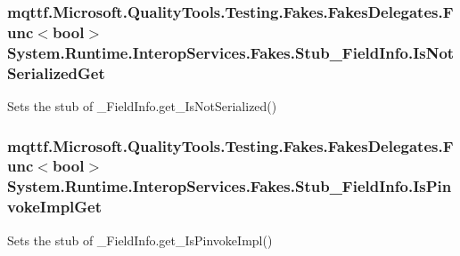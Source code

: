 \hypertarget{class_system_1_1_runtime_1_1_interop_services_1_1_fakes_1_1_stub___field_info_a972d18dfd1a9cc9afaa0d1083fe84ebc}{
\subsubsection[{Is\-Not\-Serialized\-Get}]{\setlength{\rightskip}{0pt plus 5cm}mqttf.\-Microsoft.\-Quality\-Tools.\-Testing.\-Fakes.\-Fakes\-Delegates.\-Func$<$bool$>$ System.\-Runtime.\-Interop\-Services.\-Fakes.\-Stub\-\_\-\-Field\-Info.\-Is\-Not\-Serialized\-Get}}\label{class_system_1_1_runtime_1_1_interop_services_1_1_fakes_1_1_stub___field_info_a972d18dfd1a9cc9afaa0d1083fe84ebc}


Sets the stub of \-\_\-\-Field\-Info.\-get\-\_\-\-Is\-Not\-Serialized()

\hypertarget{class_system_1_1_runtime_1_1_interop_services_1_1_fakes_1_1_stub___field_info_ac5e07cdede9b031181af04fc26a67bd7}{
\subsubsection[{Is\-Pinvoke\-Impl\-Get}]{\setlength{\rightskip}{0pt plus 5cm}mqttf.\-Microsoft.\-Quality\-Tools.\-Testing.\-Fakes.\-Fakes\-Delegates.\-Func$<$bool$>$ System.\-Runtime.\-Interop\-Services.\-Fakes.\-Stub\-\_\-\-Field\-Info.\-Is\-Pinvoke\-Impl\-Get}}\label{class_system_1_1_runtime_1_1_interop_services_1_1_fakes_1_1_stub___field_info_ac5e07cdede9b031181af04fc26a67bd7}


Sets the stub of \-\_\-\-Field\-Info.\-get\-\_\-\-Is\-Pinvoke\-Impl()


